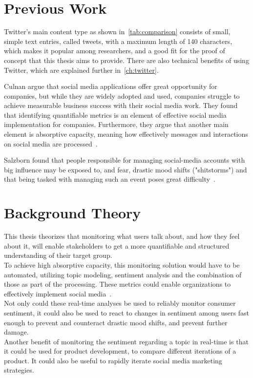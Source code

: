 \section{Previous Work}
\label{sec:previousWork}

Twitter's main content type as shown in~\cref{tab:comparison} consists of small, simple text entries, called tweets, with a maximum length of 140 characters,
which makes it popular among researchers, and a good fit for the proof of concept that this thesis aims to provide.
There are also technical benefits of using Twitter, which are explained further in~\cref{ch:twitter}.

Culnan \etAl argue that social media applications offer great opportunity for companies,
but while they are widely adopted and used,
companies struggle to achieve measurable business success with their social media work.
They found that identifying quantifiable metrics is an element of effective social media implementation for companies.
Furthermore, they argue that another main element is absorptive capacity, meaning how effectively messages and
interactions on social media are processed~\cite{Culnan2015}.

Salzborn \etAl found that people responsible for managing social-media accounts with big influence may be exposed to, and fear,
drastic mood shifts ("shitstorms") and that being tasked with managing such an event poses great difficulty~\cite{Salzborn2015}.

\section{Background Theory}
\label{sec:backgroundTheory}

This thesis theorizes that monitoring what users talk about,
and how they feel about it, will enable stakeholders to get a more quantifiable and structured understanding of their target group.\\
To achieve high absorptive capacity, this monitoring solution would have to be automated,
utilizing topic modeling, sentiment analysis and the combination of those as part of the processing.
These metrics could enable organizations to effectively implement social media~\cite{Culnan2015}.\\
Not only could these real-time analyses be used to reliably monitor consumer sentiment,
it could also be used to react to changes in sentiment among users fast enough to prevent and counteract
drastic mood shifts, and prevent further damage.\\
Another benefit of monitoring the sentiment regarding a topic in real-time is that it could be used for product development,
to compare different iterations of a product.
It could also be useful to rapidly iterate social media marketing strategies.